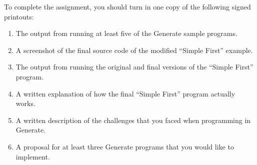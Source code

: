 \noindent
To complete the assignment, you should turn in one copy of the following signed printouts: 

\begin{enumerate}
    \itemsep0em

	\item The output from running at least five of the Generate sample programs.
		
	\item A screenshot of the final source code of the modified ``Simple First'' example.

	\item The output from running the original and final versions of the ``Simple First'' program.

	\item A written explanation of how the final ``Simple First'' program actually works.

        \item A written description of the challenges that you faced when programming in Generate.

          \item A proposal for at least three Generate programs that you would like to implement.

\end{enumerate}


